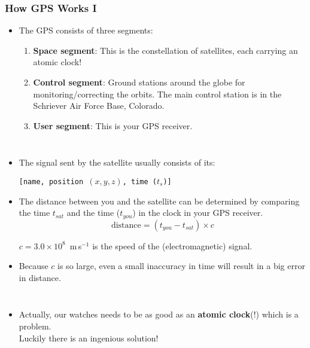 \begin{frame}
\frametitle{How GPS Works I}
\begin{itemize}
\item The GPS consists of three segments: 
\begin{enumerate}
\item \textbf{Space segment}: This is the constellation of satellites, each carrying an atomic clock!
\item \textbf{Control segment}: Ground stations around the globe for monitoring/correcting the orbits. 
The main control station is in the Schriever Air Force Base, Colorado.
\item \textbf{User segment}: This is your GPS receiver. 
\end{enumerate}
\end{itemize}
%
\begin{columns}
\begin{itemize}
\item The signal sent by the satellite usually consists of its: \centerline{\color{myGreen}\texttt{[name, position $(x,y,z)$, time ($t_s$)]}}
\item The distance between you and the satellite can be determined by comparing the time $t_{sat}$ and the time ($t_{you}$) in the clock in your GPS receiver.
\begin{equation}
\text{distance} = (t_{you} -t_{sat})\times c
\end{equation}
\begin{center}
	  $c=3.0\times10^8$~m\,s$^{-1}$ is the speed of the (electromagnetic) signal.
\end{center}
\item Because $c$ is so large, even a small inaccuracy in time will result in a big error in distance.
\end{itemize}
\end{columns}
\begin{itemize}
\item Actually, our watches needs to be as good as an \textbf{atomic clock}(!) which is a problem. \\Luckily there is an ingenious solution!
\end{itemize}

\end{frame}

